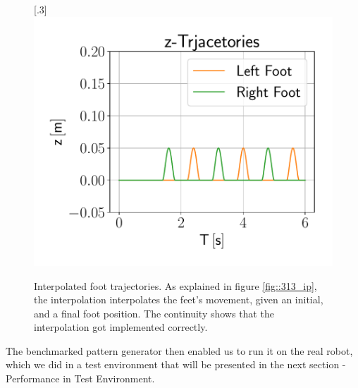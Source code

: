 \begin{figure}[h!]
	[.3\linewidth]{\includegraphics[scale=.3]{chapters/05_experiments/01_user_controlled_walking/01_benchmarking/interpolated_z_trajectories.pdf}}
	\caption{Interpolated foot trajectories. As explained in figure \ref{fig::313_ip}, the interpolation interpolates the feet's movement, given an initial, and a final foot position. The continuity shows that the interpolation got implemented correctly.}
	\label{fig::511_benchmarking_inter}
\end{figure}
 The benchmarked pattern generator then enabled us to run it on the real robot, which we did in a test environment that will be presented in the next section - Performance in Test Environment.
